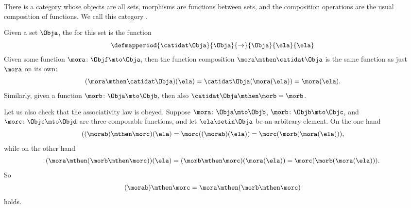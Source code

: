 
\begin{example}
    \label{exa:the-category-of-sets}
    There is a category whose objects are all sets, morphisms are functions between sets, and the composition operations are the usual composition of functions.
    We call this category \Set.

    Given a set $\Obja$, the  for this set is the function
    \begin{equation}
        \defmapperiod{
            \catidat\Obja
        }{
            \Obja
        }{
            \to
        }{
            \Obja
        }{
            \ela
        }{
            \ela
        }
    \end{equation}
    Given some function $\mora \colon \Objf \mto \Obja$, then the function composition $\mora \mthen \catidat\Obja$ is the same function as just $\mora$ on its own:
    \begin{equation}
        (\mora \mthen \catidat\Obja)(\ela)
        = \catidat\Obja(\mora (\ela)) = \mora (\ela).
    \end{equation}
    Similarly, given a function $\morb \colon \Obja \mto \Objb$, then also $\catidat\Obja \mthen \morb = \morb$.

    Let us also check that the associativity law is obeyed.
    Suppose $\mora \colon \Obja \mto \Objb$,  $\morb\colon \Objb \mto \Objc$, and  $\morc \colon \Objc \mto \Objd$ are three composable functions, and let $\ela \setin \Obja$ be an arbitrary element.
    On the one hand
    \begin{equation}
        ((\morab) \mthen \morc)(\ela) =  \morc((\morab)(\ela)) = \morc (\morb (\mora (\ela))),
    \end{equation}
    while on the other hand
    \begin{equation}
        (\mora \mthen (\morb \mthen \morc))(\ela)
        =  (\morb \mthen \morc)(\mora(\ela)) = \morc (\morb (\mora (\ela))).
    \end{equation}
    So
    \begin{equation}
        (\morab)
        \mthen \morc = \mora \mthen (\morb \mthen \morc)
    \end{equation}
    holds.
\end{example}

